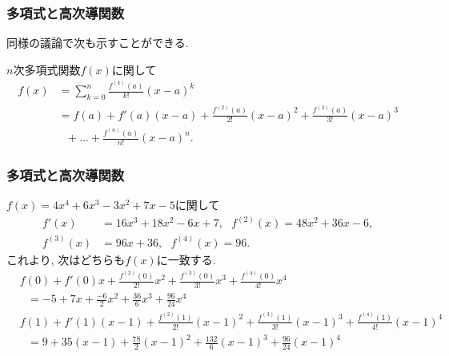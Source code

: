 \begin{frame}
\frametitle{多項式と高次導関数}

同様の議論で次も示すことができる. 

\begin{Thm} \label{poly_exp}
$n$次多項式関数$f(x)$に関して
\begin{align*}
f(x) & = \sum_{k=0}^n\frac{f^{(k)}(a)}{k!}(x-a)^k \\
& =  f(a)+ f'(a)(x-a) + \frac{f^{(2)}(a)}{2!}(x-a)^2  + \frac{f^{(3)}(a)}{3!}(x-a)^3 \\
& \ \ \ + \dots + \frac{f^{(n)}(a)}{n!}(x-a)^n. 
\end{align*}
\end{Thm}


\end{frame}







\begin{frame}
\frametitle{多項式と高次導関数}

$f(x)= 4x^4+6x^3-3x^2+7x-5$に関して
\begin{align*}
f'(x) & = 16x^3+18x^2-6x+7, \ \ \ f^{(2)}(x)  = 48x^2+36x-6, \\
f^{(3)}(x) & = 96x+36, \ \ \ f^{(4)}(x)  = 96. 
\end{align*}
これより, 次はどちらも$f(x)$に一致する. 
\begin{align*}
&  f(0)+ f'(0)x + \frac{f^{(2)}(0)}{2!}x^2  + \frac{f^{(3)}(0)}{3!}x^3+  \frac{f^{(4)}(0)}{4!}x^4 \\
& \ \ \ = -5 + 7x + \frac{-6}{2}x^2+\frac{36}{6}x^3+\frac{96}{24}x^4 \\
&  f(1)+ f'(1)(x-1) + \frac{f^{(2)}(1)}{2!}(x-1)^2  + \frac{f^{(3)}(1)}{3!}(x-1)^3+  \frac{f^{(4)}(1)}{4!}(x-1)^4 \\
& \ \ \ = 9 + 35(x-1) + \frac{78}{2}(x-1)^2+\frac{132}{6}(x-1)^3+\frac{96}{24}(x-1)^4 
\end{align*}

\end{frame}







